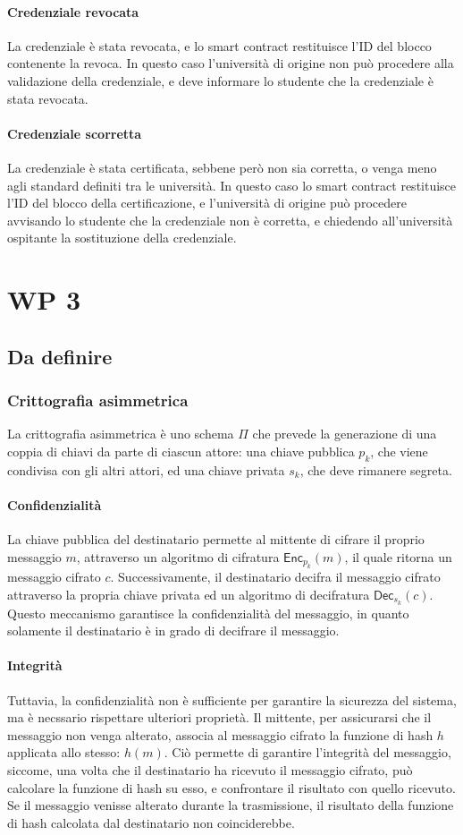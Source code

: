 \documentclass[a4paper,12pt]{article}
\begin{document}
\paragraph{Credenziale revocata} La credenziale è stata revocata, e lo smart contract restituisce l'ID del blocco contenente la revoca. In questo caso l'università di origine non può procedere alla validazione della credenziale, e deve informare lo studente che la credenziale è stata revocata.
\paragraph{Credenziale scorretta} La credenziale è stata certificata, sebbene però non sia corretta, o venga meno agli standard definiti tra le università. In questo caso lo smart contract restituisce l'ID del blocco della certificazione, e l'università di origine può procedere avvisando lo studente che la credenziale non è corretta, e chiedendo all'università ospitante la sostituzione della credenziale.
\newpage
\section{WP 3}
\subsection{Da definire}
\subsubsection{Crittografia asimmetrica}
La crittografia asimmetrica è uno schema $\Pi$ che prevede la generazione di una coppia di chiavi da parte di ciascun attore: una chiave pubblica $p_k$, che viene condivisa con gli altri attori, ed una chiave privata $s_k$, che deve rimanere segreta.
\paragraph{Confidenzialità} 
La chiave pubblica del destinatario permette al mittente di cifrare il proprio messaggio $m$, attraverso un algoritmo di cifratura $\mathsf{Enc}_{p_k}(m)$, il quale ritorna un messaggio cifrato $c$. Successivamente, il destinatario decifra il messaggio cifrato attraverso la propria chiave privata ed un algoritmo di decifratura $\mathsf{Dec}_{s_k}(c)$.
Questo meccanismo garantisce la confidenzialità del messaggio, in quanto solamente il destinatario è in grado di decifrare il messaggio.
\paragraph{Integrità}
Tuttavia, la confidenzialità non è sufficiente per garantire la sicurezza del sistema, ma è necssario rispettare ulteriori proprietà.
Il mittente, per assicurarsi che il messaggio non venga alterato, associa al messaggio cifrato la funzione di hash $h$ applicata allo stesso: $h(m)$. Ciò permette di garantire l'integrità del messaggio, siccome, una volta che il destinatario ha ricevuto il messaggio cifrato, può calcolare la funzione di hash su esso, e confrontare il risultato con quello ricevuto. Se il messaggio venisse alterato durante la trasmissione, il risultato della funzione di hash calcolata dal destinatario non coinciderebbe.
\end{document}
